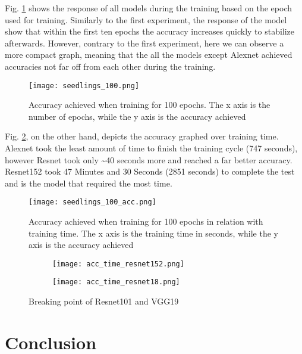 Fig. \ref{fig:seedlings_100_epoch_accuracy} shows the response of all models during the training based on the epoch used for training. Similarly to the first experiment, the response of the model show that within the first ten epochs the accuracy increases quickly to stabilize afterwards. However, contrary to the first experiment, here we can observe a more compact graph, meaning that the all the models except Alexnet achieved accuracies not far off from each other during the training. 

\begin{figure}[h]
       \centering 
	    \texttt{[image: seedlings\_100.png]}
        \caption[Accuracy achieved when training for 100 epochs]{Accuracy achieved when training for 100 epochs. The x axis is the number of epochs, while the y axis is the accuracy achieved}
         \label{fig:seedlings_100_epoch_accuracy}
\end{figure}


Fig. \ref{fig:seedlings_100_acc}, on the other hand, depicts the accuracy graphed over training time. Alexnet took the least amount of time to finish the training cycle (747 seconds), however Resnet took only \textasciitilde40 seconds more and reached a far better accuracy. Resnet152 took 47 Minutes and 30 Seconds (2851 seconds) to complete the test and is the model that required the most time. 
\begin{figure}[h]
       \centering 
	    \texttt{[image: seedlings\_100\_acc.png]}
        \caption[Accuracy achieved when training for 100 epochs in relation with training time]{Accuracy achieved when training for 100 epochs in relation with training time. The x axis is the training time in seconds, while the y axis is the accuracy achieved}
         \label{fig:seedlings_100_acc}
\end{figure}

\begin{figure}[h]
     \begin{subfigure}{0.5\textwidth}
	    \texttt{[image: acc\_time\_resnet152.png]}
        \label{fig:acc_time_resnet152}
     \end{subfigure}
     \begin{subfigure}{0.5\textwidth}
	    \texttt{[image: acc\_time\_resnet18.png]}
        \label{fig:acc_time_resnet18}
     \end{subfigure}
        \caption{Breaking point of Resnet101 and VGG19}
        \label{fig:sing_acc_time_rr}
\end{figure}


\section{Conclusion}

